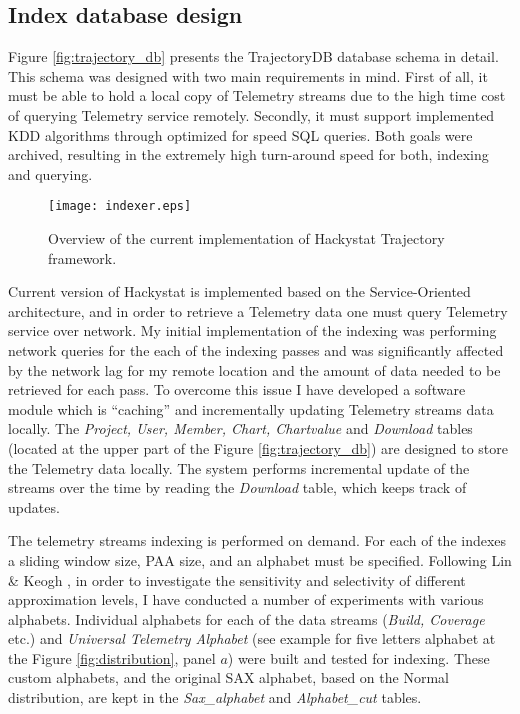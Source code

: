 \subsection{Index database design}
Figure \ref{fig:trajectory_db} presents the TrajectoryDB database schema in detail. This schema was designed with two main requirements in mind. First of all, it must be able to hold a local copy of Telemetry streams due to the high time cost of querying Telemetry service remotely. Secondly, it must support implemented KDD algorithms through optimized for speed SQL queries. Both goals were archived, resulting in the extremely high turn-around speed for both, indexing and querying.

\begin{figure}[tbp]
   \centering
   \texttt{[image: indexer.eps]}
   \caption{Overview of the current implementation of Hackystat Trajectory framework.}
   \label{fig:indexer}
\end{figure}

Current version of Hackystat is implemented based on the Service-Oriented architecture, and in order to retrieve a Telemetry data one must query Telemetry service over network. My initial implementation of the indexing was performing network queries for the each of the indexing passes and was significantly affected by the network lag for my remote location and the amount of data needed to be retrieved for each pass. To overcome this issue I have developed a software module which is ``caching'' and incrementally updating Telemetry streams data locally. The \textit{Project, User, Member, Chart, Chartvalue} and \textit{Download} tables (located at the upper part of the Figure \ref{fig:trajectory_db}) are designed to store the Telemetry data locally. The system performs incremental update of the streams over the time by reading the \textit{Download} table, which keeps track of updates.

The telemetry streams indexing is performed on demand. For each of the indexes a sliding window size, PAA size, and an alphabet must be specified. Following Lin \& Keogh \cite{citeulike:2821475}, in order to investigate the sensitivity and selectivity of different approximation levels, I have conducted a number of experiments with various alphabets. Individual alphabets for each of the data streams (\textit{Build, Coverage} etc.) and \textit{Universal Telemetry Alphabet} (see example for five letters alphabet at the Figure \ref{fig:distribution}, panel $a$) were built and tested for indexing. These custom alphabets, and the original SAX alphabet, based on the Normal distribution, are kept in the \textit{Sax\_alphabet} and \textit{Alphabet\_cut} tables. 

